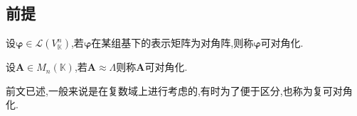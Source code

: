 \subsection{前提}
\begin{formal}
\begin{definition}[几何意义的对角化]\label{def:几何意义的对角化}
    设$\bm{\varphi}\in \mathcal{L}\left(
        V_{\mathbb{K}}^n
    \right)$,若$\bm{\varphi}$在某组基下的表示矩阵为对角阵,则称$\bm{\varphi}$可对角化.
\end{definition}
\end{formal}
\begin{formal}
\begin{definition}[代数意义的对角化]\label{def:代数意义的对角化}
    设$\bm{A}\in M_n\left(
        \mathbb{K}
    \right)$,若$\bm{A}\approx \bm{\varLambda}$则称$\bm{A}$可对角化.
\end{definition}
\end{formal}
\begin{red}
\begin{remark}
    前文已述,一般来说是在复数域上进行考虑的,有时为了便于区分,也称为复可对角化.
\end{remark}
\end{red}
